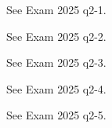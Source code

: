 

\begin{solutionbox}[Q2-1]
    See Exam 2025 q2-1.
\end{solutionbox}

\begin{solutionbox}[Q2-2]
    See Exam 2025 q2-2.
\end{solutionbox}

\begin{solutionbox}[Q2-3]
    See Exam 2025 q2-3.
\end{solutionbox}

\begin{solutionbox}[Q2-4]
    See Exam 2025 q2-4.
\end{solutionbox}

\begin{solutionbox}[Q2-5]
    See Exam 2025 q2-5.
\end{solutionbox}